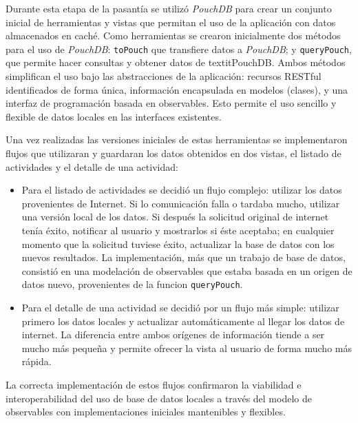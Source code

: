 Durante esta etapa de la pasantía se utilizó \textit{PouchDB} para crear un conjunto inicial de herramientas y vistas que permitan el uso de la aplicación con datos almacenados en caché. Como herramientas se crearon inicialmente dos métodos para el uso de \textit{PouchDB}: \texttt{toPouch} que transfiere datos a \textit{PouchDB}; y \texttt{queryPouch}, que permite hacer consultas y obtener datos de textit{PouchDB}. Ambos métodos simplifican el uso bajo las abstracciones de la aplicación: recursos RESTful identificados de forma única, información encapsulada en modelos (clases), y una interfaz de programación basada en observables. Esto permite el uso sencillo y flexible de datos locales en las interfaces existentes.

Una vez realizadas las versiones iniciales de estas herramientas se implementaron flujos que utilizaran y guardaran los datos obtenidos en dos vistas, el listado de actividades y el detalle de una actividad:
\begin{itemize}
  \item Para el listado de actividades se decidió un flujo complejo: utilizar los datos provenientes de Internet. Si lo comunicación falla o tardaba mucho, utilizar una versión local de los datos. Si después la solicitud original de internet tenía éxito, notificar al usuario y mostrarlos si éste aceptaba; en cualquier momento que la solicitud tuviese éxito, actualizar la base de datos con los nuevos resultados. La implementación, más que un trabajo de base de datos, consistió en una modelación de observables que estaba basada en un origen de datos nuevo, provenientes de la funcion \texttt{queryPouch}.

  \item Para el detalle de una actividad se decidió por un flujo más simple: utilizar primero los datos locales y actualizar automáticamente al llegar los datos de internet. La diferencia entre ambos orígenes de información tiende a ser mucho más pequeña y permite ofrecer la vista al usuario de forma mucho más rápida.
\end{itemize}

La correcta implementación de estos flujos confirmaron la viabilidad e interoperabilidad del uso de base de datos locales a través del modelo de observables con implementaciones iniciales mantenibles y flexibles.
